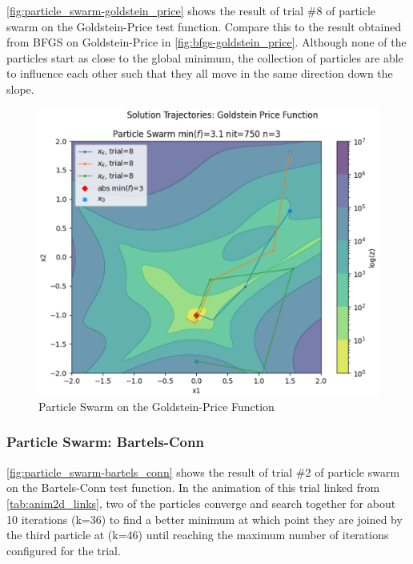 \documentclass{vgtc}                          %
\begin{document}
\autoref{fig:particle_swarm-goldstein_price} shows the result of trial \#8 of particle swarm on the Goldstein-Price test function. Compare this to the result obtained from BFGS on Goldstein-Price in \autoref{fig:bfgs-goldstein_price}.  Although none of the particles start as close to the global minimum, the collection of particles are able to influence each other such that they all move in the same direction down the slope.

\begin{figure}[tb]
\centering
\includegraphics[width=\columnwidth]{figures/pictures/images/particle_swarm-goldstein_price-plot2d-08.eps}
\caption{Particle Swarm on the Goldstein-Price Function}
\label{fig:particle_swarm-goldstein_price}
\end{figure}

\subsubsection{Particle Swarm: Bartels-Conn}

\autoref{fig:particle_swarm-bartels_conn} shows the result of trial \#2 of particle swarm on the Bartels-Conn test function.  In the animation of this trial linked from \autoref{tab:anim2d_links}, two of the particles converge and search together for about 10 iterations (k=36) to find a better minimum at which point they are joined by the third particle at (k=46) until reaching the maximum number of iterations configured for the trial.
\end{document}
